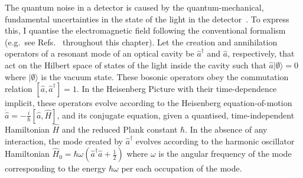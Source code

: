The quantum noise in a detector is caused by the quantum-mechanical, fundamental uncertainties in the state of the light in the detector~\cite{PhysRevD.23.1693,corbitt_2003}. %
To express this, I quantise the electromagnetic field following the conventional formalism (e.g.\ see Refs.~\cite{danilishinQuantumMeasurementTheory2012,walls_1995} throughout this chapter). Let the creation and annihilation operators of a resonant mode of an optical cavity be $\hat{a}^\dag$ and $\hat{a}$, respectively, that act on the Hilbert space of states of the light inside the cavity such that $\hat{a}\lvert\emptyset\rangle=0$ where $\lvert\emptyset\rangle$ is the vacuum state. These bosonic operators obey the commutation relation $[\hat{a},\hat{a}^\dag]=1$. 
In the Heisenberg Picture with their time-dependence implicit, these operators evolve according to the Heisenberg equation-of-motion $\dot{\hat{a}}=-\frac{i}{\hbar} [\hat a, \hat H]$, and its conjugate equation, given a quantised, time-independent Hamiltonian $\hat H$ and the reduced Plank constant $\hbar$. In the absence of any interaction, the mode created by $\hat a^\dag$ evolves according to the harmonic oscillator Hamiltonian $\hat H_0=\hbar\omega(\hat{a}^\dag\hat{a}+\frac{1}{2})$ where $\omega$ is the angular frequency of the mode corresponding to the energy $\hbar\omega$ per each occupation of the mode. %

